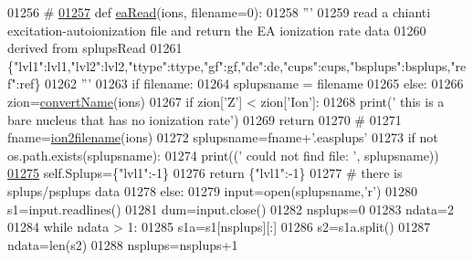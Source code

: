 \begin{DoxyCode}
{{{{{{{{{{{{01256     \textcolor{comment}{#}
\hypertarget{__chianti__tools_8py_source_l01257}{}\hyperlink{namespacepyneb_1_1utils_1_1__chianti__tools_ab4f78a2584a1ddf189af644e961f0f83}{01257} \textcolor{keyword}{def }\hyperlink{namespacepyneb_1_1utils_1_1__chianti__tools_ab4f78a2584a1ddf189af644e961f0f83}{eaRead}(ions, filename=0):
01258     \textcolor{stringliteral}{'''}
01259 \textcolor{stringliteral}{    read a chianti excitation-autoionization file and return the EA ionization rate data}
01260 \textcolor{stringliteral}{    derived from splupsRead}
01261 \textcolor{stringliteral}{    \{"lvl1":lvl1,"lvl2":lvl2,"ttype":ttype,"gf":gf,"de":de,"cups":cups,"bsplups":bsplups,"ref":ref\}}
01262 \textcolor{stringliteral}{    '''}
01263     \textcolor{keywordflow}{if} filename:
01264         splupsname = filename
01265     \textcolor{keywordflow}{else}:
01266         zion=\hyperlink{namespacepyneb_1_1utils_1_1__chianti__tools_a92cf299ad3407ee8923739e2761ab13f}{convertName}(ions)
01267         \textcolor{keywordflow}{if} zion[\textcolor{stringliteral}{'Z'}] < zion[\textcolor{stringliteral}{'Ion'}]:
01268             print(\textcolor{stringliteral}{' this is a bare nucleus that has no ionization rate'})
01269             \textcolor{keywordflow}{return}
01270         \textcolor{comment}{#}
01271         fname=\hyperlink{namespacepyneb_1_1utils_1_1__chianti__tools_ad4bc7b577fd4c3819ceb00b0a444351b}{ion2filename}(ions)
01272         splupsname=fname+\textcolor{stringliteral}{'.easplups'}
01273     \textcolor{keywordflow}{if} \textcolor{keywordflow}{not} os.path.exists(splupsname):
01274         print((\textcolor{stringliteral}{' could not find file:  '}, splupsname))
\hypertarget{__chianti__tools_8py_source_l01275}{}\hyperlink{namespacepyneb_1_1utils_1_1__chianti__tools_ae4b82a587c953b2207888a96d3364677}{01275}         self.Splups=\{\textcolor{stringliteral}{"lvl1"}:-1\}
01276         \textcolor{keywordflow}{return} \{\textcolor{stringliteral}{"lvl1"}:-1\}
01277     \textcolor{comment}{# there is splups/psplups data}
01278     \textcolor{keywordflow}{else}:
01279         input=open(splupsname,\textcolor{stringliteral}{'}\textcolor{stringliteral}{r')}
01280 \textcolor{stringliteral}{        s1=input.readlines()}
01281 \textcolor{stringliteral}{        dum=input.close()}
01282 \textcolor{stringliteral}{        nsplups=0}
01283 \textcolor{stringliteral}{        ndata=2}
01284 \textcolor{stringliteral}{        }\textcolor{keywordflow}{while} ndata > 1:
01285             s1a=s1[nsplups][:]
01286             s2=s1a.split()
01287             ndata=len(s2)
01288             nsplups=nsplups+1
}}}}}}}}}}}}
\end{DoxyCode}
